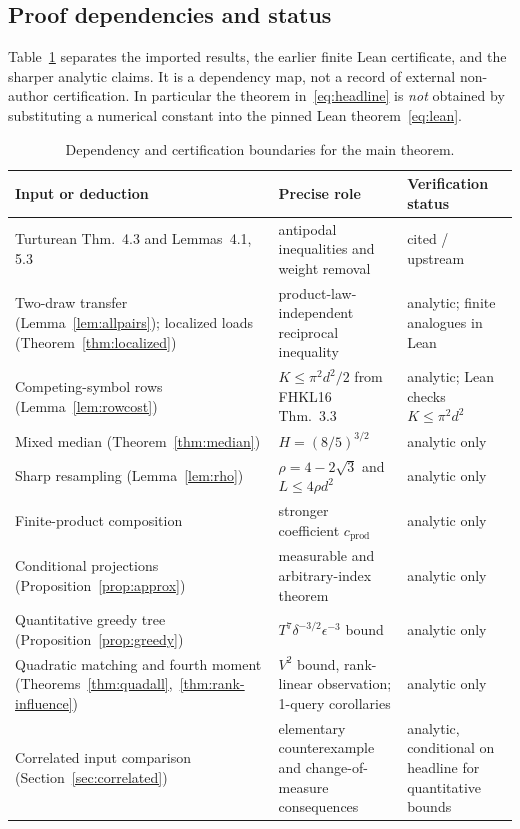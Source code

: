 \documentclass[11pt]{article}
\numberwithin{equation}{section}
\theoremstyle{remark}
\begin{document}
\subsection*{Proof dependencies and status}
Table~\ref{tab:dependencies} separates the imported results, the earlier finite
Lean certificate, and the sharper analytic claims. It is a dependency map,
not a record of external non-author certification. In particular the theorem
in~\eqref{eq:headline} is \emph{not} obtained by substituting a numerical
constant into the pinned Lean theorem~\eqref{eq:lean}.
\begin{table}[ht]
\centering\small
\begin{tabular}{@{}>{\raggedright\arraybackslash}p{.33\linewidth}>{\raggedright\arraybackslash}p{.34\linewidth}>{\raggedright\arraybackslash}p{.22\linewidth}@{}}\toprule
Input or deduction & Precise role & Verification status\\\midrule
Turturean Thm.~4.3 and Lemmas~4.1, 5.3 & antipodal inequalities and weight removal & cited / upstream\\
Two-draw transfer (Lemma~\ref{lem:allpairs}); localized loads (Theorem~\ref{thm:localized}) & product-law-independent reciprocal inequality & analytic; finite analogues in Lean\\
Competing-symbol rows (Lemma~\ref{lem:rowcost}) & $K\le\pi^2d^2/2$ from FHKL16 Thm.~3.3 & analytic; Lean checks $K\le\pi^2d^2$\\
Mixed median (Theorem~\ref{thm:median}) & $H=(8/5)^{3/2}$ & analytic only\\
Sharp resampling (Lemma~\ref{lem:rho}) & $\rho=4-2\sqrt3$ and $L\le4\rho d^2$ & analytic only\\
Finite-product composition & stronger coefficient $c_{\mathrm{prod}}$ & analytic only\\
Conditional projections (Proposition~\ref{prop:approx}) & measurable and arbitrary-index theorem & analytic only\\
Quantitative greedy tree (Proposition~\ref{prop:greedy}) & $T^7\delta^{-3/2}\epsilon^{-3}$ bound & analytic only\\
Quadratic matching and fourth moment (Theorems~\ref{thm:quadall},~\ref{thm:rank-influence}) & $V^2$ bound, rank-linear observation; 1-query corollaries & analytic only\\
Correlated input comparison (Section~\ref{sec:correlated}) & elementary counterexample and change-of-measure consequences & analytic, conditional on headline for quantitative bounds\\\bottomrule
\end{tabular}
\caption{Dependency and certification boundaries for the main theorem.}\label{tab:dependencies}
\end{table}
\FloatBarrier
\end{document}
